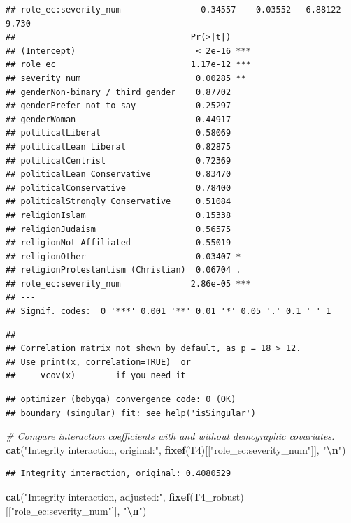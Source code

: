 \documentclass[
]{article}
\newenvironment{Shaded}{\begin{snugshade}}{\end{snugshade}}
\newcommand{\CommentTok}[1]{\textcolor[rgb]{0.56,0.35,0.01}{\textit{#1}}}
\newcommand{\FunctionTok}[1]{\textcolor[rgb]{0.13,0.29,0.53}{\textbf{#1}}}
\newcommand{\NormalTok}[1]{#1}
\newcommand{\SpecialCharTok}[1]{\textcolor[rgb]{0.81,0.36,0.00}{\textbf{#1}}}
\newcommand{\StringTok}[1]{\textcolor[rgb]{0.31,0.60,0.02}{#1}}
\begin{document}
\begin{verbatim}
## role_ec:severity_num                0.34557    0.03552   6.88122   9.730
##                                   Pr(>|t|)    
## (Intercept)                        < 2e-16 ***
## role_ec                           1.17e-12 ***
## severity_num                       0.00285 ** 
## genderNon-binary / third gender    0.87702    
## genderPrefer not to say            0.25297    
## genderWoman                        0.44917    
## politicalLiberal                   0.58069    
## politicalLean Liberal              0.82875    
## politicalCentrist                  0.72369    
## politicalLean Conservative         0.83470    
## politicalConservative              0.78400    
## politicalStrongly Conservative     0.51084    
## religionIslam                      0.15338    
## religionJudaism                    0.56575    
## religionNot Affiliated             0.55019    
## religionOther                      0.03407 *  
## religionProtestantism (Christian)  0.06704 .  
## role_ec:severity_num              2.86e-05 ***
## ---
## Signif. codes:  0 '***' 0.001 '**' 0.01 '*' 0.05 '.' 0.1 ' ' 1
\end{verbatim}

\begin{verbatim}
## 
## Correlation matrix not shown by default, as p = 18 > 12.
## Use print(x, correlation=TRUE)  or
##     vcov(x)        if you need it
\end{verbatim}

\begin{verbatim}
## optimizer (bobyqa) convergence code: 0 (OK)
## boundary (singular) fit: see help('isSingular')
\end{verbatim}

\begin{Shaded}
\begin{Highlighting}[]
\CommentTok{\# Compare interaction coefficients with and without demographic covariates.}
\FunctionTok{cat}\NormalTok{(}\StringTok{"Integrity interaction, original:"}\NormalTok{,}
    \FunctionTok{fixef}\NormalTok{(T4)[[}\StringTok{"role\_ec:severity\_num"}\NormalTok{]], }\StringTok{"}\SpecialCharTok{\textbackslash{}n}\StringTok{"}\NormalTok{)}
\end{Highlighting}
\end{Shaded}

\begin{verbatim}
## Integrity interaction, original: 0.4080529
\end{verbatim}

\begin{Shaded}
\begin{Highlighting}[]
\FunctionTok{cat}\NormalTok{(}\StringTok{"Integrity interaction, adjusted:"}\NormalTok{,}
    \FunctionTok{fixef}\NormalTok{(T4\_robust)[[}\StringTok{"role\_ec:severity\_num"}\NormalTok{]], }\StringTok{"}\SpecialCharTok{\textbackslash{}n}\StringTok{"}\NormalTok{)}
\end{Highlighting}
\end{Shaded}
\end{document}
